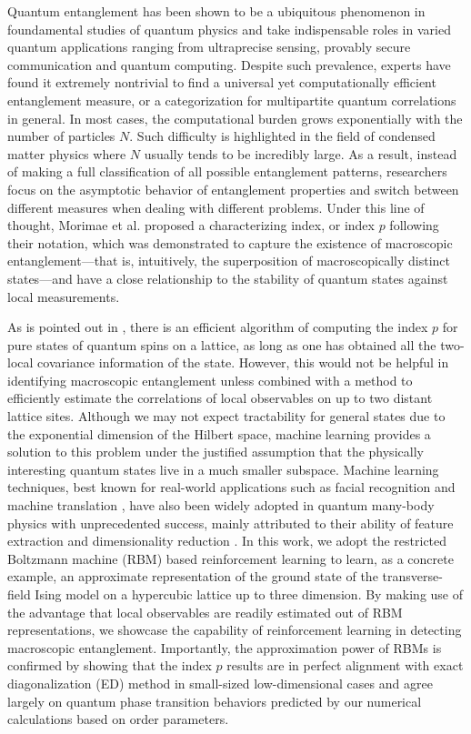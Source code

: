 \documentclass[aps,prl,reprint,superscriptaddress]{revtex4-2}
\begin{document}
Quantum entanglement has been shown to be a ubiquitous phenomenon in foundamental studies of quantum physics and take indispensable roles in varied quantum applications ranging from ultraprecise sensing, provably secure communication and quantum computing. Despite such prevalence, experts have found it extremely nontrivial to find a universal yet computationally efficient entanglement measure, or a categorization for multipartite quantum correlations in general. In most cases, the computational burden grows exponentially with the number of particles $ N $. Such difficulty is highlighted in the field of condensed matter physics where $ N $ usually tends to be incredibly large. As a result, instead of making a full classification of all possible entanglement patterns, researchers focus on the asymptotic behavior of entanglement properties and switch between different measures when dealing with different problems. Under this line of thought, Morimae et al. \cite{Morimae2005Macroscopic} proposed a characterizing index, or index $ p $ following their notation, which was demonstrated to capture the existence of macroscopic entanglement---that is, intuitively, the superposition of macroscopically distinct states---and have a close relationship to the stability of quantum states against local measurements.

As is pointed out in \cite{Morimae2005Macroscopic}, there is an efficient algorithm of computing the index $ p $ for pure states of quantum spins on a lattice, as long as one has obtained all the two-local covariance information of the state. However, this would not be helpful in identifying macroscopic entanglement unless combined with a method to efficiently estimate the correlations of local observables on up to two distant lattice sites. Although we may not expect tractability for general states due to the exponential dimension of the Hilbert space, machine learning provides a solution to this problem under the justified assumption that the physically interesting quantum states live in a much smaller subspace. Machine learning techniques, best known for real-world applications such as facial recognition and machine translation \cite{Lecun2015Deep}, have also been widely adopted in quantum many-body physics with unprecedented success, mainly attributed to their ability of feature extraction and dimensionality reduction \cite{Carleo2017Solving,Carrasquilla2017ML-phase,Deng2017ML-topo,Deng2018ML-Bell,Dunjko2018ML-AI-quantum-review}. In this work, we adopt the restricted Boltzmann machine (RBM) based reinforcement learning to learn, as a concrete example, an approximate representation of the ground state of the transverse-field Ising model on a hypercubic lattice up to three dimension. By making use of the advantage that local observables are readily estimated out of RBM representations, we showcase the capability of reinforcement learning in detecting macroscopic entanglement. Importantly, the approximation power of RBMs is confirmed by showing that the index $ p $ results are in perfect alignment with exact diagonalization (ED) method in small-sized low-dimensional cases and agree largely on quantum phase transition behaviors predicted by our numerical calculations based on order parameters.
\end{document}
